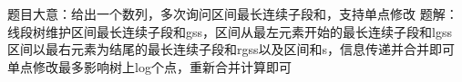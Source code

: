 题目大意：给出一个数列，多次询问区间最长连续子段和，支持单点修改
题解：线段树维护区间最长连续子段和gss，区间从最左元素开始的最长连续子段和lgss
区间以最右元素为结尾的最长连续子段和rgss以及区间和s，信息传递并合并即可
单点修改最多影响树上log个点，重新合并计算即可